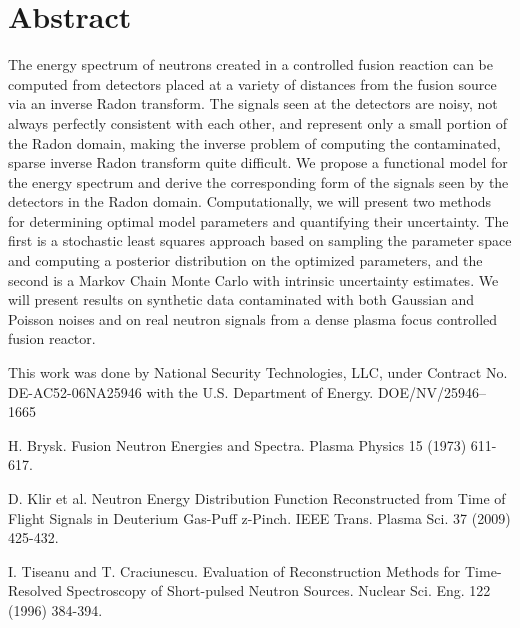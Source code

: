 \documentclass[article, A4, 11pt]{llncs}%
\begin{document}
\section*{Abstract}
The energy spectrum of neutrons created in a controlled fusion reaction can be computed from detectors placed at a variety of distances from the fusion source via an inverse Radon transform. The signals seen at the detectors are noisy, not always perfectly consistent with each other, and represent only a small portion of the Radon domain, making the inverse problem of computing the contaminated, sparse inverse Radon transform quite difficult. We propose a functional model for the energy spectrum and derive the corresponding form of the signals seen by the detectors in the Radon domain. Computationally, we will present two methods for determining optimal model parameters and quantifying their uncertainty. The first is a stochastic least squares approach based on sampling the parameter space and computing a posterior distribution on the optimized parameters, and the second is a Markov Chain Monte Carlo with intrinsic uncertainty estimates. We will present results on synthetic data contaminated with both Gaussian and Poisson noises and on real neutron signals from a dense plasma focus controlled fusion reactor.

This work was done by National Security Technologies, LLC, under Contract No. DE-AC52-06NA25946 with the U.S. Department of Energy. DOE/NV/25946--1665


\begin{thebibliography}{10}
{\sc H. Brysk}. {Fusion Neutron Energies and Spectra}. Plasma Physics 15 (1973) 611-617.

{\sc D. Klir et al}. {Neutron Energy Distribution Function Reconstructed from Time of Flight Signals in Deuterium Gas-Puff z-Pinch}. IEEE Trans. Plasma Sci. 37 (2009) 425-432.

{\sc I. Tiseanu and T. Craciunescu}. {Evaluation of Reconstruction Methods for Time-Resolved Spectroscopy of Short-pulsed Neutron Sources}. Nuclear Sci. Eng. 122 (1996) 384-394.
\end{thebibliography} %
\end{document}
